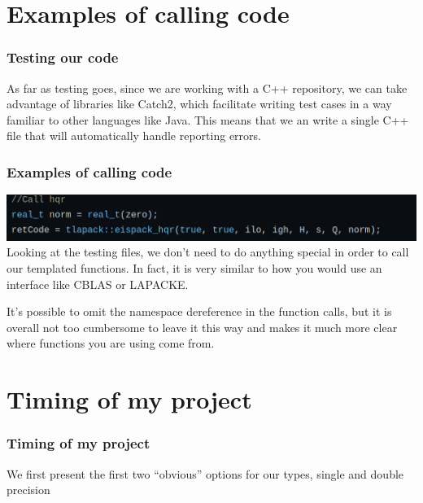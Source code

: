 \documentclass[12pt]{beamer}
\begin{document}
    \section{Examples of calling code}
    \begin{frame}
        \frametitle{Testing our code}
        As far as testing goes, since we are working with a C++ repository, we can take advantage of libraries
        like Catch2, which facilitate writing test cases in a way familiar to other languages like Java. This
        means that we an write a single C++ file that will automatically handle reporting errors.
    \end{frame}
    \begin{frame}
        \frametitle{Examples of calling code}
        \includegraphics[width=\textwidth]{images/callingHqr.png}
        Looking at the testing files, we don't need to do anything special in order to call our templated
        functions. In fact, it is very similar to how you would use an interface like CBLAS or LAPACKE.

        It's possible to omit the namespace dereference in the function calls, but it is overall not too
        cumbersome to leave it this way and makes it much more clear where functions you are using come from.
    \end{frame}
    \section{Timing of my project}
    \begin{frame}
        \frametitle{Timing of my project}
        We first present the first two ``obvious'' options for our types, single and double precision

    \end{frame}
\end{document}
